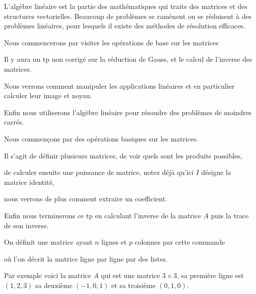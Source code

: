 






\debuttexte


\diapo

L'algèbre linéaire est la partie des mathématiques qui 
traite des matrices et des structures vectorielles.
Beaucoup de problèmes se ramènent ou se réduisent à %
des problèmes linéaires, pour lesquels il existe  
des 
méthodes de résolution efficaces.

\change

\change
Nous commencerons par visiter les opérations de base sur les matrices

\change
Il y aura un tp non corrigé sur la réduction de Gauss,  et le calcul de l'inverse des matrices.

\change
Nous verrons comment manipuler les applications linéaires
et en particulier calculer leur image et noyau.

\change
Enfin nous utiliserons l'algèbre linéaire pour résoudre des problèmes de moindres carrés.



\diapo

Nous commençons par des opérations basiques sur les matrices.

Il s'agit de définir plusieurs matrices, de voir quels sont les produits possibles,

de calculer ensuite une puissance de matrice, notez déjà qu'ici $I$ désigne la matrice identité,

nous verrons de plus comment extraire un coefficient.

Enfin nous terminerons ce tp en calculant l'inverse de la matrice $A$ puis la trace de son inverse.

\diapo

On définit une matrice ayant $n$ lignes et $p$ colonnes par cette commande

où l'on décrit la matrice ligne par ligne par des listes.
 
 
\change

Par exemple voici la matrice $A$ qui est une matrice $3 \times 3$,
sa première ligne est $(1,2,3)$ sa deuxième $(-1,0,1)$ et sa troisième $(0,1,0)$.

